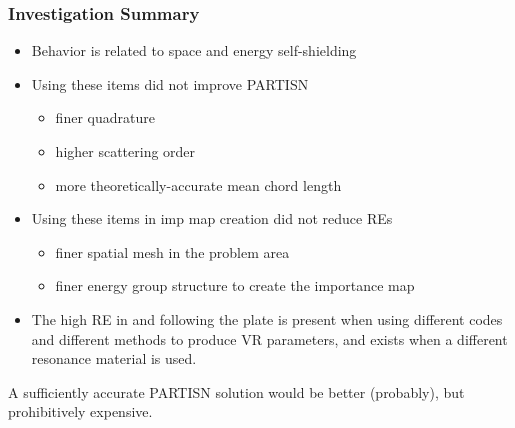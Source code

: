 \documentclass[xcolor=x11names,compress]{beamer}
\renewcommand{\(}{\begin{columns}}
\renewcommand{\)}{\end{columns}}
\newcommand{\<}[1]{\begin{column}{#1}}
\renewcommand{\>}{\end{column}}
\begin{document}
\begin{frame}[fragile]
  \frametitle{Investigation Summary}
  
	\begin{itemize}
	\item Behavior is related to space and energy self-shielding
	
	\item Using these items did not improve PARTISN
	 \begin{itemize}
	 \item finer quadrature
	 \item higher scattering order
	 \item more theoretically-accurate mean chord length
	 \end{itemize}
	 
	\item Using these items in imp map creation did not reduce REs
	 \begin{itemize}
	 \item finer spatial mesh in the problem area
	 \item finer energy group structure to create the importance map
	 \end{itemize}
	 
	\item The high RE in and following the plate is present when using different codes and different methods to produce VR parameters, and exists when a different resonance material is used.
	\end{itemize}


A sufficiently accurate PARTISN solution would be better (probably), but prohibitively expensive.
  
\end{frame}


\end{document}
